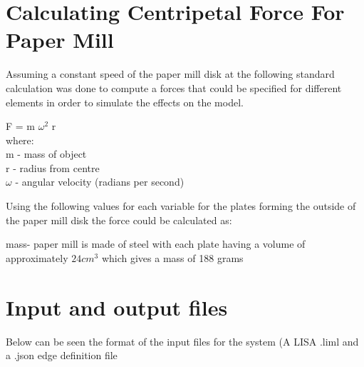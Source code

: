 \begin{changemargin}{\CMwidth}{\CMheight}
\section{Calculating Centripetal Force For Paper Mill}
Assuming a constant speed of the paper mill disk at  the following standard calculation was done to compute a forces that could be specified for different elements in order to simulate the effects on the model.

F = m $\omega^2$ r\\ 

where: \\ 
m - mass of object \\ 
r - radius from centre \\ 
$\omega$ - angular velocity (radians per second)

Using the following values for each variable for the plates forming the outside of the paper mill disk the force could be calculated as:

mass- paper mill is made of steel with each plate having a volume of approximately $24cm^3$ which gives a mass of
188 grams




\cite{Centripetal}

\section{Input and output files}
Below can be seen the format of the input files for the system (A LISA .liml and a .json edge definition file\\


\end{changemargin}
